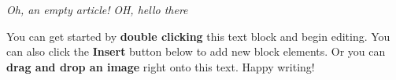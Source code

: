\textit{Oh, an empty article!} 
\textit{OH, hello there}

You can get started by \textbf{double clicking} this text block and begin editing. You can also click the \textbf{Insert} button below to add new block elements. Or you can \textbf{drag and drop an image} right onto this text. Happy writing!
